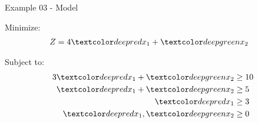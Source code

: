 \begin{frame}{Example 03 - Model}

Minimize:
\begin{align*}
    Z &= 4\colora{x_1} + \colorb{x_2}
\end{align*}

Subject to:
\begin{align*}
    3\colora{x_1} + \colorb{x_2} &\ge 10 \\
     \colora{x_1} + \colorb{x_2} &\ge 5 \\
     \colora{x_1} &\ge 3 \\
     \colora{x_1}, \colorb{x_2} &\ge 0
\end{align*}

\end{frame}

